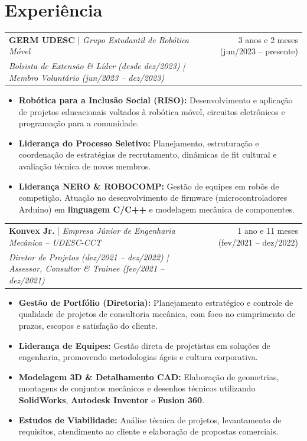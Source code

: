 \documentclass[11pt,a4paper,sans]{article}
\makeatletter
\newcommand{\experienceHeader}[4]{
    \noindent
    \begin{tabularx}{\textwidth}{@{} X r @{}}
        \textbf{\color{primaryColor}#1} | \textit{#2} & \small{#3} \\
        \small\textit{\color{textColor}#4} & \\
    \end{tabularx}
    \vspace{-2pt}
}
\makeatother
\begin{document}
\section{Experiência}

\experienceHeader
  {GERM UDESC}
  {Grupo Estudantil de Robótica Móvel}
  {3 anos e 2 meses (jun/2023 -- presente)}
  {Bolsista de Extensão \& Líder (desde dez/2023) | Membro Voluntário (jun/2023 -- dez/2023)}

\begin{itemize}[nosep, leftmargin=*]
    \item \textbf{Robótica para a Inclusão Social (RISO):} Desenvolvimento e aplicação de projetos educacionais voltados à robótica móvel, circuitos eletrônicos e programação para a comunidade.
    \item \textbf{Liderança do Processo Seletivo:} Planejamento, estruturação e coordenação de estratégias de recrutamento, dinâmicas de fit cultural e avaliação técnica de novos membros.
    \item \textbf{Liderança NERO \& ROBOCOMP:} Gestão de equipes em robôs de competição. Atuação no desenvolvimento de firmware (microcontroladores Arduino) em \textbf{linguagem C/C++} e modelagem mecânica de componentes.
\end{itemize}

\vspace{6pt}

\experienceHeader
  {Konvex Jr.}
  {Empresa Júnior de Engenharia Mecânica -- UDESC-CCT}
  {1 ano e 11 meses (fev/2021 -- dez/2022)}
  {Diretor de Projetos (dez/2021 -- dez/2022) | Assessor, Consultor \& Trainee (fev/2021 -- dez/2021)}

\begin{itemize}[nosep, leftmargin=*]
    \item \textbf{Gestão de Portfólio (Diretoria):} Planejamento estratégico e controle de qualidade de projetos de consultoria mecânica, com foco no cumprimento de prazos, escopos e satisfação do cliente.
    \item \textbf{Liderança de Equipes:} Gestão direta de projetistas em soluções de engenharia, promovendo metodologias ágeis e cultura corporativa.
    \item \textbf{Modelagem 3D \& Detalhamento CAD:} Elaboração de geometrias, montagens de conjuntos mecânicos e desenhos técnicos utilizando \textbf{SolidWorks}, \textbf{Autodesk Inventor} e \textbf{Fusion 360}.
    \item \textbf{Estudos de Viabilidade:} Análise técnica de projetos, levantamento de requisitos, atendimento ao cliente e elaboração de propostas comerciais.
\end{itemize}
\end{document}
